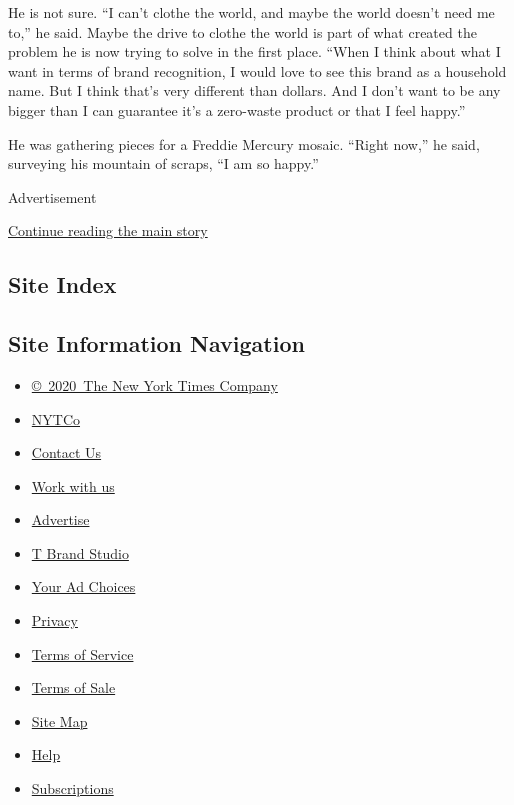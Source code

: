 He is not sure. ``I can't clothe the world, and maybe the world doesn't
need me to,'' he said. Maybe the drive to clothe the world is part of
what created the problem he is now trying to solve in the first place.
``When I think about what I want in terms of brand recognition, I would
love to see this brand as a household name. But I think that's very
different than dollars. And I don't want to be any bigger than I can
guarantee it's a zero-waste product or that I feel happy.''

He was gathering pieces for a Freddie Mercury mosaic. ``Right now,'' he
said, surveying his mountain of scraps, ``I am so happy.''

Advertisement

\protect\hyperlink{after-bottom}{Continue reading the main story}

\hypertarget{site-index}{%
\subsection{Site Index}\label{site-index}}

\hypertarget{site-information-navigation}{%
\subsection{Site Information
Navigation}\label{site-information-navigation}}

\begin{itemize}
\tightlist
\item
  \href{https://help.nytimes.com/hc/en-us/articles/115014792127-Copyright-notice}{©~2020~The
  New York Times Company}
\end{itemize}

\begin{itemize}
\tightlist
\item
  \href{https://www.nytco.com/}{NYTCo}
\item
  \href{https://help.nytimes.com/hc/en-us/articles/115015385887-Contact-Us}{Contact
  Us}
\item
  \href{https://www.nytco.com/careers/}{Work with us}
\item
  \href{https://nytmediakit.com/}{Advertise}
\item
  \href{http://www.tbrandstudio.com/}{T Brand Studio}
\item
  \href{https://www.nytimes.com/privacy/cookie-policy\#how-do-i-manage-trackers}{Your
  Ad Choices}
\item
  \href{https://www.nytimes.com/privacy}{Privacy}
\item
  \href{https://help.nytimes.com/hc/en-us/articles/115014893428-Terms-of-service}{Terms
  of Service}
\item
  \href{https://help.nytimes.com/hc/en-us/articles/115014893968-Terms-of-sale}{Terms
  of Sale}
\item
  \href{https://spiderbites.nytimes.com}{Site Map}
\item
  \href{https://help.nytimes.com/hc/en-us}{Help}
\item
  \href{https://www.nytimes.com/subscription?campaignId=37WXW}{Subscriptions}
\end{itemize}
